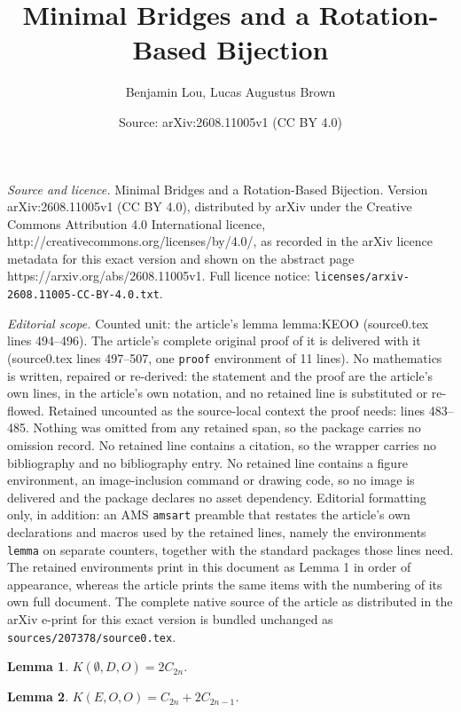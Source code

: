 \documentclass[10pt,a4paper]{amsart}
\title{Minimal Bridges and a Rotation-Based Bijection}
\author{Benjamin Lou, Lucas Augustus Brown}
\date{Source: arXiv:2608.11005v1 (CC BY 4.0)}
\newtheorem{lemma}{Lemma}
\begin{document}
\maketitle

\noindent\emph{Source and licence.} Minimal Bridges and a Rotation-Based Bijection. Version arXiv:2608.11005v1 (CC BY 4.0), distributed by arXiv under the Creative Commons Attribution 4.0 International licence, http://creativecommons.org/licenses/by/4.0/, as recorded in the arXiv licence metadata for this exact version and shown on the abstract page https://arxiv.org/abs/2608.11005v1. Full licence notice: \texttt{licenses/arxiv-2608.11005-CC-BY-4.0.txt}.\par\smallskip

\noindent\textit{Editorial scope.} Counted unit: the article's lemma lemma:KEOO (source0.tex lines 494--496). The article's complete original proof of it is delivered with it (source0.tex lines 497--507, one \texttt{proof} environment of 11 lines). No mathematics is written, repaired or re-derived: the statement and the proof are the article's own lines, in the article's own notation, and no retained line is substituted or re-flowed.  Retained uncounted as the source-local context the proof needs: lines 483--485.  Nothing was omitted from any retained span, so the package carries no omission record.  No retained line contains a citation, so the wrapper carries no bibliography and no bibliography entry.  No retained line contains a figure environment, an image-inclusion command or drawing code, so no image is delivered and the package declares no asset dependency.  Editorial formatting only, in addition: an AMS \texttt{amsart} preamble that restates the article's own declarations and macros used by the retained lines, namely the environments \texttt{lemma} on separate counters, together with the standard packages those lines need.  The retained environments print in this document as Lemma 1 in order of appearance, whereas the article prints the same items with the numbering of its own full document.  The complete native source of the article as distributed in the arXiv e-print for this exact version is bundled unchanged as \texttt{sources/207378/source0.tex}.
\begin{lemma} \label{lemma:KnullDO}
$K(\emptyset,D,O) = 2C_{2n}$.
\end{lemma}

\begin{lemma} \label{lemma:KEOO}
$K(E,O,O) = C_{2n} + 2C_{2n-1}$.
\end{lemma}
\end{document}
